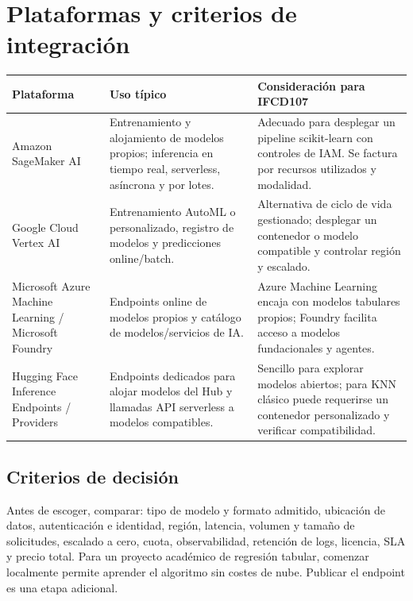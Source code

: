\documentclass[11pt,a4paper]{article}
\begin{document}
\section{Plataformas y criterios de integración}
\begin{longtable}{p{2.7cm}p{4.8cm}p{5.3cm}}
\toprule
\textbf{Plataforma} & \textbf{Uso típico} & \textbf{Consideración para IFCD107}\\
\midrule
Amazon SageMaker AI & Entrenamiento y alojamiento de modelos propios; inferencia en tiempo real, serverless, asíncrona y por lotes. & Adecuado para desplegar un pipeline scikit-learn con controles de IAM. Se factura por recursos utilizados y modalidad.\\
Google Cloud Vertex AI & Entrenamiento AutoML o personalizado, registro de modelos y predicciones online/batch. & Alternativa de ciclo de vida gestionado; desplegar un contenedor o modelo compatible y controlar región y escalado.\\
Microsoft Azure Machine Learning / Microsoft Foundry & Endpoints online de modelos propios y catálogo de modelos/servicios de IA. & Azure Machine Learning encaja con modelos tabulares propios; Foundry facilita acceso a modelos fundacionales y agentes.\\
Hugging Face Inference Endpoints / Providers & Endpoints dedicados para alojar modelos del Hub y llamadas API serverless a modelos compatibles. & Sencillo para explorar modelos abiertos; para KNN clásico puede requerirse un contenedor personalizado y verificar compatibilidad.\\
\bottomrule
\end{longtable}

\subsection{Criterios de decisión}
Antes de escoger, comparar: tipo de modelo y formato admitido, ubicación de datos, autenticación e identidad, región, latencia, volumen y tamaño de solicitudes, escalado a cero, cuota, observabilidad, retención de logs, licencia, SLA y precio total. Para un proyecto académico de regresión tabular, comenzar localmente permite aprender el algoritmo sin costes de nube. Publicar el endpoint es una etapa adicional.
\end{document}
